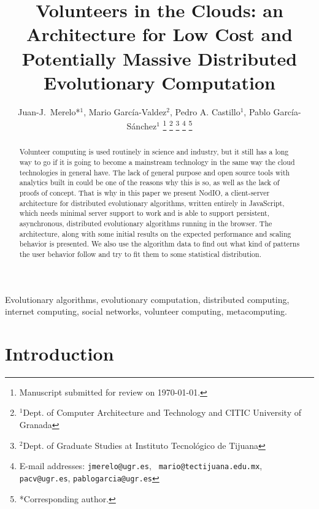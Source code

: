 \documentclass[journal,onecolumn]{IEEEtran}
\begin{document}
\title{Volunteers in the Clouds: an Architecture for Low Cost and
  Potentially Massive Distributed Evolutionary Computation} 

\author{Juan-J.~Merelo*$^1$, Mario Garc\'ia-Valdez$^2$, Pedro A. Castillo$^1$, Pablo Garc\'ia-S\'anchez$^1$
\thanks{Manuscript submitted for review on \today.}%
\thanks{$^1$Dept. of Computer Architecture and Technology and CITIC University of Granada}%
\thanks{$^2$Dept. of Graduate Studies at Instituto Tecnol\'ogico de Tijuana}%
\thanks{E-mail addresses: {\tt jmerelo@ugr.es}, {\tt
    mario@tectijuana.edu.mx}, {\tt pacv@ugr.es}, {\tt pablogarcia@ugr.es}}%
\thanks{*Corresponding author.}%
}

\maketitle

\begin{abstract}
Volunteer computing is used routinely in science and industry, but it
still has a long way to go if it is going to become a mainstream technology in the
same way the cloud technologies in general have. The lack of general purpose and open source tools
with analytics built in could be one of the reasons why this is so, as
well as the lack of proofs of concept. That is why in this paper we
present NodIO, a client-server architecture for distributed
evolutionary algorithms, written entirely in JavaScript, which needs
minimal server support to work and is able to support persistent,
asynchronous, distributed evolutionary algorithms running in the
browser. The architecture, along with some initial results on the expected performance and scaling
behavior is presented. We also use the algorithm data to  %
find out what kind of patterns the user behavior follow and try to fit them to some statistical distribution.
\end{abstract}

\begin{IEEEkeywords}
Evolutionary algorithms, evolutionary computation, distributed computing, internet computing,
social networks, volunteer computing, metacomputing. 
\end{IEEEkeywords}


\section{Introduction}
\end{document}
